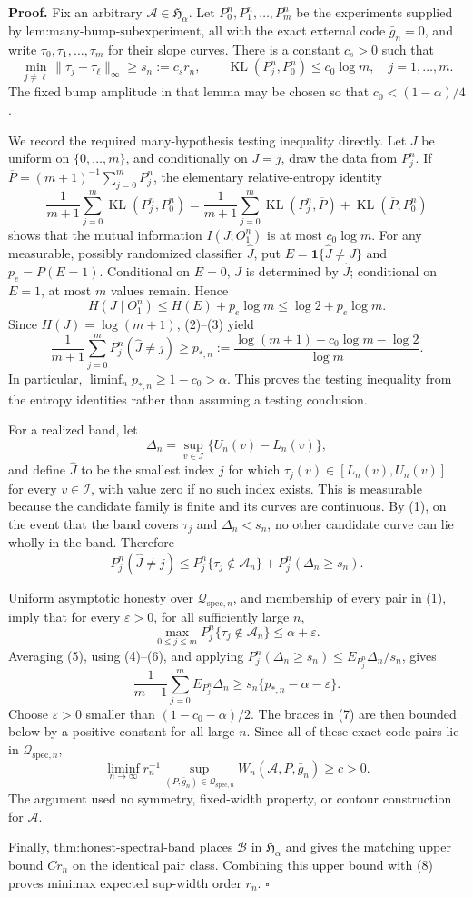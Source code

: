 \textbf{Proof.}
Fix an arbitrary \(\mathcal A\in\mathfrak H_\alpha\). Let \(P_0^n,P_1^n,\ldots,P_m^n\) be the experiments supplied by \(\text{lem:many-bump-subexperiment}\), all with the exact external code \(\bar g_n=0\), and write \(\tau_0,\tau_1,\ldots,\tau_m\) for their slope curves. There is a constant \(c_s>0\) such that
\[
 \min_{j\ne\ell}\|\tau_j-\tau_\ell\|_\infty
 \ge s_n:=c_sr_n, \qquad
 \operatorname{KL}(P_j^n,P_0^n)\le c_0\log m,
 \quad j=1,\ldots,m. \tag{1}
\]
The fixed bump amplitude in that lemma may be chosen so that \(c_0<(1-\alpha)/4\).

We record the required many-hypothesis testing inequality directly. Let \(J\) be uniform on \(\{0,\ldots,m\}\), and conditionally on \(J=j\), draw the data from \(P_j^n\). If \(\overline P=(m+1)^{-1}\sum_{j=0}^mP_j^n\), the elementary relative-entropy identity
\[
 \frac1{m+1}\sum_{j=0}^m\operatorname{KL}(P_j^n,P_0^n)
 =\frac1{m+1}\sum_{j=0}^m\operatorname{KL}(P_j^n,\overline P)
 +\operatorname{KL}(\overline P,P_0^n) \tag{2}
\]
shows that the mutual information \(I(J;O_1^n)\) is at most \(c_0\log m\). For any measurable, possibly randomized classifier \(\widehat J\), put \(E=\mathbf 1\{\widehat J\ne J\}\) and \(p_e=P(E=1)\). Conditional on \(E=0\), \(J\) is determined by \(\widehat J\); conditional on \(E=1\), at most \(m\) values remain. Hence
\[
 H(J\mid O_1^n)
 \le H(E)+p_e\log m
 \le\log2+p_e\log m. \tag{3}
\]
Since \(H(J)=\log(m+1)\), (2)--(3) yield
\[
 \frac1{m+1}\sum_{j=0}^mP_j^n(\widehat J\ne j)
 \ge p_{*,n}:=\frac{\log(m+1)-c_0\log m-\log2}{\log m}. \tag{4}
\]
In particular, \(\liminf_np_{*,n}\ge1-c_0>\alpha\). This proves the testing inequality from the entropy identities rather than assuming a testing conclusion.

For a realized band, let
\[
 \Delta_n=\sup_{v\in\mathcal I}\{U_n(v)-L_n(v)\},
\]
and define \(\widehat J\) to be the smallest index \(j\) for which \(\tau_j(v)\in[L_n(v),U_n(v)]\) for every \(v\in\mathcal I\), with value zero if no such index exists. This is measurable because the candidate family is finite and its curves are continuous. By (1), on the event that the band covers \(\tau_j\) and \(\Delta_n<s_n\), no other candidate curve can lie wholly in the band. Therefore
\[
 P_j^n(\widehat J\ne j)
 \le P_j^n\{\tau_j\notin\mathcal A_n\}
 +P_j^n(\Delta_n\ge s_n). \tag{5}
\]

Uniform asymptotic honesty over \(\mathcal Q_{\mathrm{spec},n}\), and membership of every pair in (1), imply that for every \(\varepsilon>0\), for all sufficiently large \(n\),
\[
 \max_{0\le j\le m}P_j^n\{\tau_j\notin\mathcal A_n\}
 \le\alpha+\varepsilon. \tag{6}
\]
Averaging (5), using (4)--(6), and applying \(P_j^n(\Delta_n\ge s_n)\le E_{P_j^n}\Delta_n/s_n\), gives
\[
 \frac1{m+1}\sum_{j=0}^mE_{P_j^n}\Delta_n
 \ge s_n\{p_{*,n}-\alpha-\varepsilon\}. \tag{7}
\]
Choose \(\varepsilon>0\) smaller than \((1-c_0-\alpha)/2\). The braces in (7) are then bounded below by a positive constant for all large \(n\). Since all of these exact-code pairs lie in \(\mathcal Q_{\mathrm{spec},n}\),
\[
 \liminf_{n\to\infty}r_n^{-1}
 \sup_{(P,\bar g_n)\in\mathcal Q_{\mathrm{spec},n}}
 W_n(\mathcal A,P,\bar g_n)\ge c>0. \tag{8}
\]
The argument used no symmetry, fixed-width property, or contour construction for \(\mathcal A\).

Finally, \(\text{thm:honest-spectral-band}\) places \(\mathcal B\) in \(\mathfrak H_\alpha\) and gives the matching upper bound \(Cr_n\) on the identical pair class. Combining this upper bound with (8) proves minimax expected sup-width order \(r_n\). \(\square\)